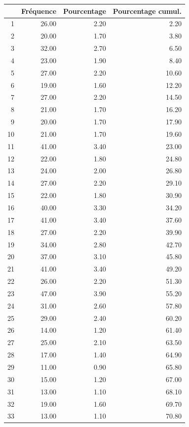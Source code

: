 \documentclass[12pt,english,french,twoside]{report}\usepackage[]{graphicx}\usepackage[]{color}
\begin{document}
\begin{table}[ht]
\centering
\begin{tabular}{rrrr}
  \hline
 & Fréquence & Pourcentage & Pourcentage cumul. \\ 
  \hline
1 & 26.00 & 2.20 & 2.20 \\ 
  2 & 20.00 & 1.70 & 3.80 \\ 
  3 & 32.00 & 2.70 & 6.50 \\ 
  4 & 23.00 & 1.90 & 8.40 \\ 
  5 & 27.00 & 2.20 & 10.60 \\ 
  6 & 19.00 & 1.60 & 12.20 \\ 
  7 & 27.00 & 2.20 & 14.50 \\ 
  8 & 21.00 & 1.70 & 16.20 \\ 
  9 & 20.00 & 1.70 & 17.90 \\ 
  10 & 21.00 & 1.70 & 19.60 \\ 
  11 & 41.00 & 3.40 & 23.00 \\ 
  12 & 22.00 & 1.80 & 24.80 \\ 
  13 & 24.00 & 2.00 & 26.80 \\ 
  14 & 27.00 & 2.20 & 29.10 \\ 
  15 & 22.00 & 1.80 & 30.90 \\ 
  16 & 40.00 & 3.30 & 34.20 \\ 
  17 & 41.00 & 3.40 & 37.60 \\ 
  18 & 27.00 & 2.20 & 39.90 \\ 
  19 & 34.00 & 2.80 & 42.70 \\ 
  20 & 37.00 & 3.10 & 45.80 \\ 
  21 & 41.00 & 3.40 & 49.20 \\ 
  22 & 26.00 & 2.20 & 51.30 \\ 
  23 & 47.00 & 3.90 & 55.20 \\ 
  24 & 31.00 & 2.60 & 57.80 \\ 
  25 & 29.00 & 2.40 & 60.20 \\ 
  26 & 14.00 & 1.20 & 61.40 \\ 
  27 & 25.00 & 2.10 & 63.50 \\ 
  28 & 17.00 & 1.40 & 64.90 \\ 
  29 & 11.00 & 0.90 & 65.80 \\ 
  30 & 15.00 & 1.20 & 67.00 \\ 
  31 & 13.00 & 1.10 & 68.10 \\ 
  32 & 19.00 & 1.60 & 69.70 \\ 
  33 & 13.00 & 1.10 & 70.80 \\ 

\end{tabular}
\end{table}
\end{document}
